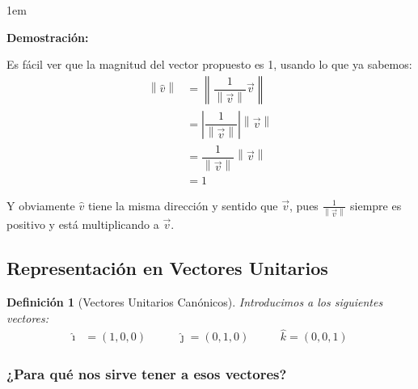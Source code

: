 \documentclass[12pt, fleqn]{report}                             %
\newenvironment{SmallIndentation}[1][0.75em]                    %
        {\begin{adjustwidth}{#1}{}\begin{footnotesize}}             %
        {\end{footnotesize}\end{adjustwidth}}                       %
\DeclareMathOperator \MegaSpace {\quad \quad}                   %
\newtheorem{Definition}{Definición}[section]                    %
\theoremstyle{break}                                            %
\newcommand{\hati} {\hat{\imath}}                               %
\newcommand{\hatj} {\hat{\jmath}}                               %
\newcommand{\hatk} {\hat{k}}                                    %
\newcommand{\abs}[1]{\left\lvert #1 \right\lvert}               %
\newcommand{\Abs}[1]{\left\lVert #1 \right\lVert}               %
\begin{document}
                \begin{SmallIndentation}[1em]
                    \textbf{Demostración:}

                    Es fácil ver que la magnitud del vector propuesto es 1, usando lo que ya sabemos:
                    \begin{align*}
                        \Abs{\hat{v}} 
                            &= \Abs{\dfrac{1}{\Abs{\vec{v}}} \vec{v}}               \\
                            &= \abs{\dfrac{1}{\Abs{\vec{v}}}} \Abs{\vec{v}}         \\
                            &= \dfrac{1}{\Abs{\vec{v}}} \Abs{\vec{v}}               \\
                            &= 1
                    \end{align*}

                    Y obviamente $\hat{v}$ tiene la misma dirección y sentido que $\vec{v}$,
                    pues $\frac{1}{\Abs{\vec{v}}}$ siempre es positivo y está multiplicando a $\vec{v}$.

                \end{SmallIndentation}
            
            \clearpage
            \subsection{Representación en Vectores Unitarios}
        
                \begin{Definition}[Vectores Unitarios Canónicos]
                    
                    Introducimos a los siguientes vectores:
                    \begin{align}
                        \hati &= (1, 0, 0) \MegaSpace \hatj = (0, 1, 0) \MegaSpace \hatk = (0, 0, 1)
                    \end{align}

                \end{Definition}
            
                \subsubsection{¿Para qué nos sirve tener a esos vectores?}
\end{document}
